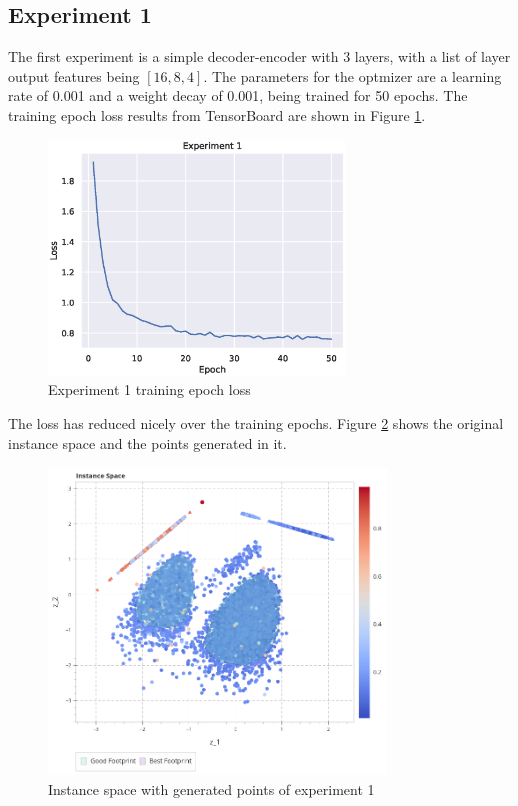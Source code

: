 \subsection{Experiment 1}

The first experiment is a simple decoder-encoder with 3 layers, with a list of layer output features being $[16, 8, 4]$. The parameters for the optmizer are a learning rate of 0.001 and a weight decay of 0.001, being trained for 50 epochs. The training epoch loss results from TensorBoard are shown in Figure \ref{fig:exp1}.

\begin{figure}[H]
    \centering
    \includegraphics[width=0.7\textwidth]{Cap5/loss_exp1}
    \caption{Experiment 1 training epoch loss}
    \label{fig:exp1}
\end{figure}

The loss has reduced nicely over the training epochs. Figure \ref{fig:is_gen_points1} shows the original instance space and the points generated in it.

\begin{figure}[H]
    \centering
    \includegraphics[width=0.8\textwidth]{Cap5/is_exp1}
    \caption{Instance space with generated points of experiment 1}
    \label{fig:is_gen_points1}
\end{figure}

